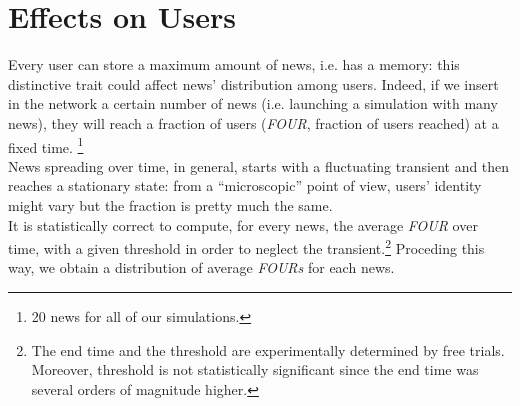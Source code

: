 \section{Effects on Users} \label{sec:users}
Every user can store a maximum amount of  news, i.e. has a memory: this distinctive trait could affect news' distribution among users.
Indeed, if we insert in the network a certain number of news
(i.e. launching a simulation with many news), they will reach a
fraction of users (\textit{FOUR}, fraction of users reached)
at a fixed time.
\footnote{20 news for all of our simulations.}\\
News spreading over time, in general, starts with a fluctuating
transient and then reaches a stationary state: from a ``microscopic''
point of view, users' identity might vary but the fraction is
pretty much the same. \\
It is statistically correct to compute, for every news, the average
\textit{FOUR} over time, with a given threshold in order to
neglect the transient.\footnote{The end time and the threshold are
  experimentally determined by free trials. Moreover, threshold is
  not statistically significant since the end time was several orders of magnitude higher.}
Proceding this way, we obtain a distribution of average \textit{FOURs}
for each news.\\

